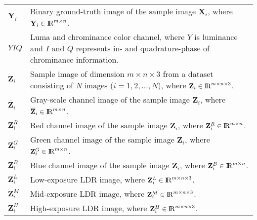 \begin{longtable}[l]{p{80pt}p{320pt}}
$\mathbf{Y}_{i}$ & Binary ground-truth image of the sample image $\mathbf{X}_{i}$, where $\mathbf{Y}_{i} \in {\rm I\!R}^{m \times n}$.\\
$YIQ$ & Luma and chrominance color channel, where $Y$ is luminance and $I$ and $Q$ represents in- and quadrature-phase of chrominance information.\\
$\mathbf{Z}_{i}$ & Sample image of dimension $m \times n \times 3$ from a dataset consisting of \emph{N} images ($i=1,2,...,N$), where $\mathbf{Z}_{i} \in {\rm I\!R}^{m \times n \times 3}$. \\
$\bar{\mathbf{Z}}_i$ & Gray-scale channel image of the sample image $\mathbf{Z}_{i}$, where $\overline{\mathbf{Z}}_i \in {\rm I\!R}^{m \times n}$.\\
$\mathbf{Z}_i^{R}$ & Red channel image of the sample image $\mathbf{Z}_{i}$, where $\mathbf{Z}_i^{R} \in {\rm I\!R}^{m \times n}$.\\
$\mathbf{Z}_i^{G}$ & Green channel image of the sample image $\mathbf{Z}_{i}$, where $\mathbf{Z}_i^{G} \in {\rm I\!R}^{m \times n}$.\\
$\mathbf{Z}_i^{B}$ & Blue channel image of the sample image $\mathbf{Z}_{i}$, where $\mathbf{Z}_i^{B} \in {\rm I\!R}^{m \times n}$.\\
$\mathbf{Z}_i^{L}$ & Low-exposure LDR image, where $\mathbf{Z}_i^{L} \in {\rm I\!R}^{m \times n \times 3}$.\\
$\mathbf{Z}_i^{M}$ & Mid-exposure LDR image, where $\mathbf{Z}_i^{M} \in {\rm I\!R}^{m \times n \times 3}$.\\
$\mathbf{Z}_i^{H}$ & High-exposure LDR image, where $\mathbf{Z}_i^{H} \in {\rm I\!R}^{m \times n \times 3}$.\\

\end{longtable}


